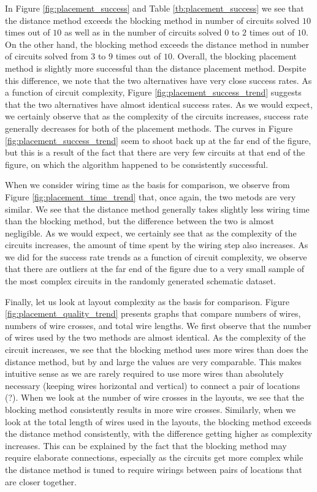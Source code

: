 In Figure \ref{fig:placement_success} and Table \ref{tb:placement_success} we
see that the distance method exceeds the blocking method in number of circuits
solved $10$ times out of $10$ as well as in the number of circuits solved $0$
to $2$ times out of $10$. On the other hand, the blocking method exceeds the
distance method in number of circuits solved from $3$ to $9$ times out
of $10$. Overall, the blocking placement method is slightly more successful
than the distance placement method. Despite this difference, we note that the
two alternatives have very
close success rates. As a function of circuit complexity, Figure
\ref{fig:placement_success_trend} suggests that the two alternatives have almost
identical success rates. As we would expect, we certainly observe that as the
complexity of the circuits
increases, success rate generally decreases for both of the placement methods.
The curves in Figure \ref{fig:placement_success_trend} seem to shoot back up
at the far end of the figure, but this is a result of the fact that there are
very few circuits at that end of the figure, on which the algorithm happened to
be consistently successful.

When we consider wiring time as the basis for comparison, we observe from
Figure \ref{fig:placement_time_trend} that, once again, the two metods are
very similar. We see that the distance method generally takes slightly less
wiring time than the blocking method, but the difference between the two is
almost negligible. As we would expect, we certainly see that as the complexity
of the circuits increases, the amount of time spent by the wiring step also
increases. As we did for the success rate trends as a function of circuit
complexity, we observe that there are outliers at the far end of the figure due
to a very small sample of the most complex circuits in the randomly generated
schematic dataset.

Finally, let us look at layout complexity as the basis for comparison. Figure
\ref{fig:placement_quality_trend} presents graphs that compare numbers of wires,
numbers of wire crosses, and total wire lengths. We first observe that the
number of wires used by the two methods are almost identical. As the complexity
of the circuit increases, we see that the blocking method uses more wires than
does the distance method, but by and large the values are very comparable. This
makes intuitive sense as we are rarely required to use more wires than
absolutely necessary (keeping wires horizontal and vertical) to connect a pair
of locations (?). When we look at the number of wire crosses in the layouts, we
see that the blocking method consistently results in more wire crosses. Similarly,
when we look at the total length of wires used in the layouts, the blocking
method exceeds the distance method consistently, with the difference getting
higher as complexity increases. This can be explained by the fact that the
blocking method may require elaborate connections, especially as the circuits
get more complex while the distance method is tuned to require wirings between
pairs of locations that are closer together.

